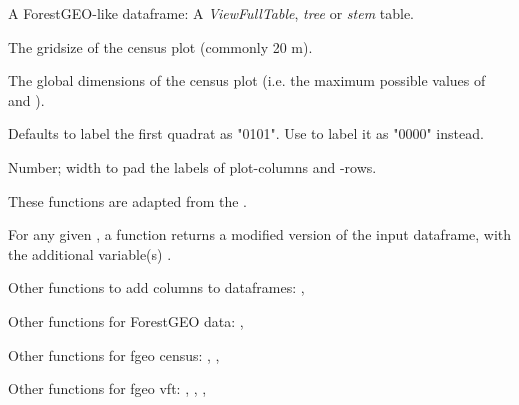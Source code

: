 \documentclass[a4paper]{book}
\begin{document}
\begin{Arguments}
\begin{ldescription}
\item[\code{data}] A ForestGEO-like dataframe: A \emph{ViewFullTable}, \emph{tree} or \emph{stem}
table.

\item[\code{gridsize}] The gridsize of the census plot (commonly 20 m).

\item[\code{plotdim}] The global dimensions of the census plot (i.e. the
maximum possible values of  and ).

\item[\code{start}] Defaults to label the first quadrat as "0101". Use  to
label it as "0000" instead.

\item[\code{width}] Number; width to pad the labels of plot-columns and -rows.
\end{ldescription}
\end{Arguments}
%
\begin{Details}\relax
These functions are adapted from the .
\end{Details}
%
\begin{Value}
For any given , a function  returns a modified
version of the input dataframe, with the additional variable(s) .
\end{Value}
%
\begin{SeeAlso}\relax
Other functions to add columns to dataframes: ,

Other functions for ForestGEO data: ,

Other functions for fgeo census: ,
, 

Other functions for fgeo vft: ,
, ,
\end{SeeAlso}
%
\end{document}

